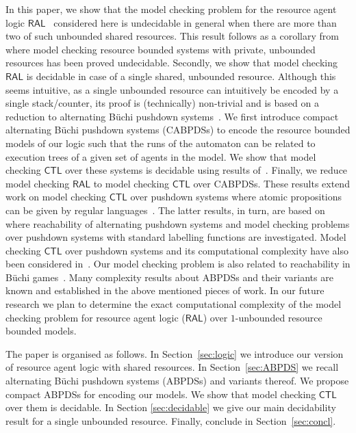 \documentclass{llncs}
\newcommand{\ral}{\ensuremath{\mathsf{RAL}}\xspace}
\renewcommand{\CTL}{\ensuremath{\mathsf{CTL}}\xspace}
\begin{document}
In this paper, we show that the model checking problem for the resource agent logic $\ral$~\cite{Bulling/Farwer:10a} considered here is undecidable in general  when there are more than two of such unbounded shared resources. This result follows as a corollary from~\cite{Bulling/Farwer:10a,Bulling15ral-IJCAI} where model checking resource bounded systems with private, unbounded resources has been proved undecidable. 
Secondly, we show that model checking  \ral is decidable in case of  a single shared, unbounded resource. Although this seems intuitive, as a single unbounded resource can intuitively  be encoded by a single stack/counter, its proof is (technically)  non-trivial and is based on a reduction to  alternating B\"uchi pushdown systems~\cite{song2014efficient,bouajjani1997reachability}. We first introduce  compact alternating B\"uchi pushdown systems (CABPDSs)  to encode the resource bounded models of our logic such  that the runs of the automaton can be related to execution trees of a given set of agents in the model. We show that model checking \CTL over these systems is decidable using results of~\cite{song2014efficient}. Finally, we reduce model checking \ral to model checking \CTL over CABPDSs. These results extend work on model checking \CTL over pushdown systems where atomic propositions can be given by regular languages~\cite{song2014efficient}. The latter results, in turn, are based on~\cite{bouajjani1997reachability} where reachability of alternating pushdown systems and model checking problems over pushdown systems with standard labelling functions are investigated. Model checking \CTL  over pushdown systems and its computational complexity have also been considered in~\cite{bozzelli2007complexity}. Our model checking problem is also related to reachability in B\"uchi games~\cite{cachat2002symbolic}. Many complexity results about ABPDSs and their variants are known and established in the above mentioned pieces of work. In our future research we  plan to determine the exact computational complexity of the model checking problem for resource agent logic (\ral) over  $1$-unbounded resource bounded models.

The paper is organised as follows. In Section~\ref{sec:logic} we  introduce our version of resource agent logic with shared resources.  In Section~\ref{sec:ABPDS} we recall  alternating B\"uchi pushdown systems (ABPDSs) and variants thereof. We propose compact ABPDSs for encoding our models. We show that model checking \CTL over them is decidable. In Section \ref{sec:decidable} we give our main decidability result for a single unbounded resource. Finally, conclude in Section~\ref{sec:concl}. 
\vspace{-0.4cm}
\end{document}

